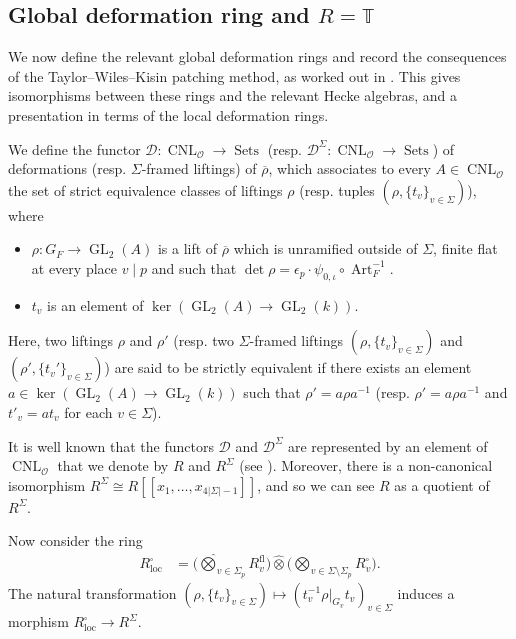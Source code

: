 \documentclass[a4paper, notitlepage, 10pt]{amsart}
\theoremstyle{plain} %
\theoremstyle{definition} %
\theoremstyle{remark} %
\numberwithin{equation}{section}
\newcommand{\GL}{\operatorname{GL}} %
\newcommand{\CNL}{\operatorname{CNL}}
\newcommand{\Art}{\operatorname{Art}} %
\newcommand{\Sets}{\operatorname{Sets}} %
\begin{document}
\subsection{Global deformation ring and $R=\mathbb{T}$}\label{globaldefringandr=t}
We now define the relevant global deformation rings and record the consequences of the Taylor–Wiles–Kisin patching method, as worked out in \cite{BKM2}. This gives isomorphisms between these rings and the relevant Hecke algebras, and a presentation in terms of the local deformation rings.

We define the functor $\mathcal{D}\colon \CNL_{\mathcal{O}}\to \Sets$ (resp. $\mathcal{D}^\Sigma\colon \CNL_{\mathcal{O}}\to \Sets$) of deformations (resp. $\Sigma$-framed liftings) of $\overline{\rho}$, which associates to every $A\in\CNL_{\mathcal{O}}$ the set of strict equivalence classes of liftings $\rho$ (resp. tuples $(\rho,\{t_v\}_{v\in \Sigma})$), where
\begin{itemize}
    \item $\rho\colon G_F\to \GL_2(A)$ is a lift of $\overline{\rho}$ which is unramified outside of $\Sigma$, finite flat at every place $v\mid p$ and such that $\det \rho= \epsilon_p\cdot \psi_{0,\iota}\circ \Art_F^{-1}$.
    \item $t_v$ is an element of $\ker(\GL_2(A)\to \GL_2(k))$.
\end{itemize}
Here, two liftings $\rho$ and $\rho'$ (resp. two $\Sigma$-framed liftings $(\rho,\{t_v\}_{v\in \Sigma})$ and $(\rho',\{t_v'\}_{v\in \Sigma})$) are said to be strictly equivalent if there exists an element $a\in \ker(\GL_2(A)\to \GL_2(k))$ such that $\rho'=a\rho a^{-1}$ (resp. $\rho'=a\rho a^{-1}$ and $t'_v=a t_v$ for each $v\in \Sigma$). 

It is well known that the functors $\mathcal{D}$ and $\mathcal{D}^\Sigma$ are represented by an element of $\CNL_{\mathcal{O}}$ that we denote by $R$ and $R^{\Sigma}$ (see \cite[(3.2.1)]{Kis09}). Moreover, there is a non-canonical isomorphism $R^\Sigma\cong R[[x_1,\dots,x_{4|\Sigma|-1}]]$, and so we can see $R$ as a quotient of $R^\Sigma$.

Now consider the ring
\begin{align*}
    R_{\text{loc}}^\square&= \Big(\widehat{\bigotimes}_{v\in \Sigma_p} R_v^{\text{fl}}\Big)\widehat{\otimes} \Big(\widehat{\bigotimes}_{v\in \Sigma\setminus \Sigma_p}R_v^{\square}\Big).
\end{align*}
The natural transformation $(\rho,\{t_v\}_{v\in \Sigma})\mapsto (t_v^{-1}\rho|_{G_v}t_v)_{v\in \Sigma}$ induces a morphism $R_{\text{loc}}^\square\to R^{\Sigma}$.
\end{document}
